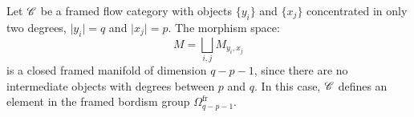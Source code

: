 \begin{exmp}\label{ex:closed_flow_cat}
Let $\mathscr{C}$ be a framed flow category with objects $\{ y_i \}$ and $\{ x_j \}$ concentrated in only two degrees,  $\lvert y_i \rvert = q$ and $\lvert x_j \rvert = p$. The morphism space:
\begin{equation*}
    M = \bigsqcup_{i,j} M_{y_i, x_j}
\end{equation*}
is a closed framed manifold of dimension $q - p - 1$, since there are no intermediate objects with degrees between $p$ and $q$. In this case, $\mathscr{C}$ defines an element in the framed bordism group $\Omega^{\operatorname{fr}}_{q - p - 1}$.
\end{exmp}
